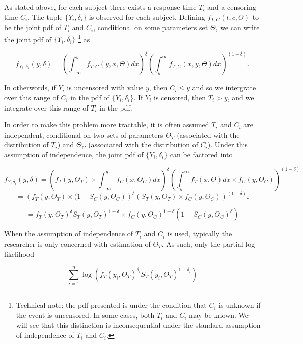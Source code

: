 \documentclass[a4paper]{article}
\begin{document}
  As stated above, for each subject there exists a response time $T_i$ and a censoring time $C_i$. The tuple $\{Y_i, \delta_i\}$ is observed for each subject. Defining $f_{T, C}(t, c, \Theta)$ to be the joint pdf of $T_i$ and $C_i$, conditional on some parameters set $\Theta$, we can write the joint pdf of $\{Y_i, \delta_i\}$ 
  \footnote{Technical note: the pdf presented is under the condition that $C_i$ is unknown if the event is uncensored. In some cases, both $T_i$ and $C_i$ may be known. We will see that this distinction is inconsequential under the standard assumption of independence of $T_i$ and $C_i$.} as

  
  \[
  f_{Y_i, \delta_i}(y, \delta) = \left( \int_{-\infty}^{y} f_{T, C} (y, x, \Theta) dx \right) ^ {\delta}
  \left( \int_{y}^{\infty} f_{T, C} (x, y, \Theta) dx \right) ^{(1-\delta)}.
  \]

  In otherwords, if $Y_i$ is uncensored with value $y$, then $C_i \leq y$ and so we intergrate over this range of $C_i$ in the pdf of $\{Y_i, \delta_i\}$. If $Y_i$ is censored, then $T_i > y$, and we integrate over this range of $T_i$ in the pdf. 
  
  In order to make this problem more tractable, it is often assumed $T_i$ and $C_i$ are independent, conditional on two sets of parameters $\Theta_T$ (associated with the distribution of $T_i$) and $\Theta_C$ (associated with the distribution of $C_i$). Under this assumption of independence, the joint pdf of $\{Y_i, \delta_i\}$ can be factored into 
  
  \[
  f_{Y, \delta_i}(y, \delta) = 
  \left( f_{T} (y, \Theta_T) \times \int_{-\infty}^{y} f_{C}(x, \Theta_C) dx\right) ^ {\delta}
  \left( \int_{y}^{\infty} f_{T} (x, \Theta) dx \times f_{C}(y, \Theta_C) \right) ^{(1-\delta)}
  \]
  \[
  = 
  \left( f_{T} (y, \Theta_T) \times (1 - S_C(y, \Theta_{C}) \right) ^ {\delta}
  \left( S_T(y, \Theta_{T}) \times f_{C}(y, \Theta_C) \right) ^{(1-\delta)}.
  \]
  
  \[
  =
  f_{T}(y, \Theta_T) ^{\delta} S_{T}(y, \Theta_T) ^{1 - \delta} 
  \times
  f_C(y, \Theta_C)^{1 - \delta} (1 - S_C(y, \Theta_C) ^{\delta} )
  \]

  
  When the assumption of independence of $T_i$ and $C_i$ is used, typically the researcher is only concerned with estimation of $\Theta_T$. As such, only the partial log likelihood 
  
  \begin{equation}
  \displaystyle \sum_{i = 1}^n \log \left( f_T(y_i, \Theta_T)^{\delta_i} S_T(y_i, \Theta_T)^{1-\delta_i} \right)
  \end{equation}
  \label{eq:right_llk}
\end{document}
